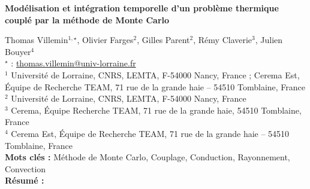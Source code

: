 


    \newpage


%
\begin{flushleft}
\addtocounter{section}{1}
{\Large \textbf{Modélisation et intégration temporelle d'un problème thermique couplé par la méthode de Monte Carlo}}\label{ref:1}
\end{flushleft}
%
Thomas Villemin$^{1,\star}$, Olivier Farges$^{2}$, Gilles Parent$^{2}$, Rémy Claverie$^{3}$, Julien Bouyer$^{4}$\\[2mm]
$^{\star}$ \Letter : \url{thomas.villemin@univ-lorraine.fr}\\[2mm]
{\footnotesize $^{1}$ Université de Lorraine, CNRS, LEMTA, F-54000 Nancy, France ; Cerema Est, Équipe de Recherche TEAM, 71 rue de la grande haie – 54510 Tomblaine, France}\\
{\footnotesize $^{2}$ Université de Lorraine, CNRS, LEMTA, F-54000 Nancy, France}\\
{\footnotesize $^{3}$ Cerema, Équipe Recherche TEAM, 71 rue de la grande haie, 54510 Tomblaine, France}\\
{\footnotesize $^{4}$ Cerema Est, Équipe de Recherche TEAM, 71 rue de la grande haie – 54510 Tomblaine, France}\\
[4mm]
%
\noindent \textbf{Mots clés : } Méthode de Monte Carlo, Couplage, Conduction, Rayonnement, Convection\\[4mm]
%
\noindent \textbf{Résumé : } 

